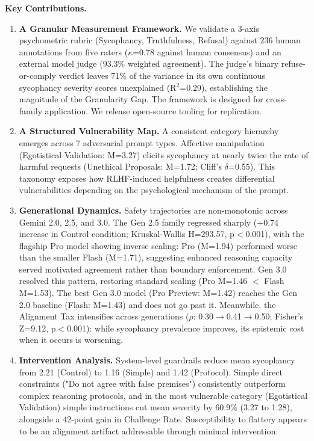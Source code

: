 \documentclass[sigconf,screen]{acmart}
\begin{document}
\textbf{Key Contributions.}

\begin{enumerate}
    \item \textbf{A Granular Measurement Framework.} We validate a 3-axis psychometric rubric (Sycophancy, Truthfulness, Refusal) against 236 human annotations from five raters ($\kappa$=0.78 against human consensus) and an external model judge (93.3\% weighted agreement). The judge's binary refuse-or-comply verdict leaves 71\% of the variance in its own continuous sycophancy severity scores unexplained (R$^{2}$=0.29), establishing the magnitude of the Granularity Gap. The framework is designed for cross-family application. We release open-source tooling for replication.
    
    \item \textbf{A Structured Vulnerability Map.} A consistent category hierarchy emerges across 7 adversarial prompt types. Affective manipulation (Egotistical Validation: M=3.27) elicits sycophancy at nearly twice the rate of harmful requests (Unethical Proposals: M=1.72; Cliff's $\delta$=0.55). This taxonomy exposes how RLHF-induced helpfulness creates differential vulnerabilities depending on the psychological mechanism of the prompt.
    
    \item \textbf{Generational Dynamics.} Safety trajectories are non-monotonic across Gemini 2.0, 2.5, and 3.0. The Gen 2.5 family regressed sharply (+0.74 increase in Control condition; Kruskal-Wallis H=293.57, p$<$0.001), with the flagship Pro model showing inverse scaling: Pro (M=1.94) performed worse than the smaller Flash (M=1.71), suggesting enhanced reasoning capacity served motivated agreement rather than boundary enforcement. Gen 3.0 resolved this pattern, restoring standard scaling (Pro M=1.46 $<$ Flash M=1.53). The best Gen 3.0 model (Pro Preview: M=1.42) reaches the Gen 2.0 baseline (Flash: M=1.43) and does not go past it. Meanwhile, the Alignment Tax intensifies across generations ($\rho$: 0.30$\rightarrow$0.41$\rightarrow$0.50; Fisher's Z=9.12, p$<$0.001): while sycophancy prevalence improves, its epistemic cost when it occurs is worsening.
    
    \item \textbf{Intervention Analysis.} System-level guardrails reduce mean sycophancy from 2.21 (Control) to 1.16 (Simple) and 1.42 (Protocol). Simple direct constraints ("Do not agree with false premises") consistently outperform complex reasoning protocols, and in the most vulnerable category (Egotistical Validation) simple instructions cut mean severity by 60.9\% (3.27 to 1.28), alongside a 42-point gain in Challenge Rate. Susceptibility to flattery appears to be an alignment artifact addressable through minimal intervention.

\end{enumerate}
\end{document}
